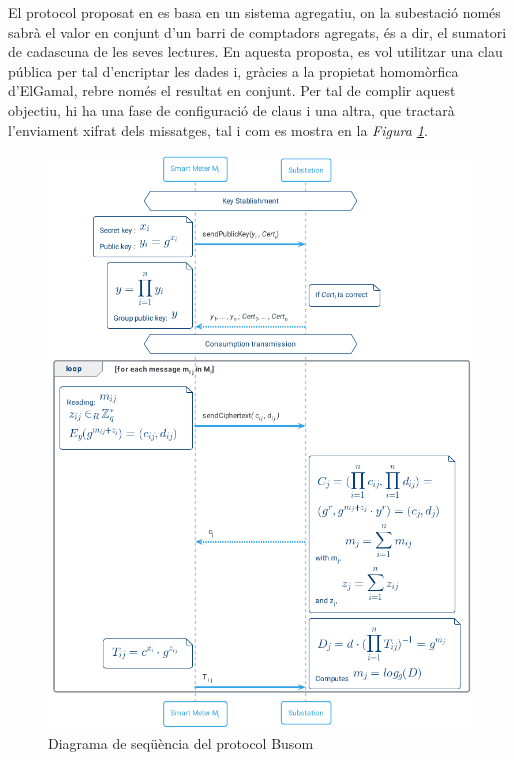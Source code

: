 

El protocol proposat en \cite{busom} es basa en un sistema agregatiu, on la subestació només sabrà el valor en conjunt d'un barri de comptadors agregats, és a dir, el sumatori de cadascuna de les seves lectures. En aquesta proposta, es vol utilitzar una clau pública per tal d'encriptar les dades i, gràcies a la propietat homomòrfica d'ElGamal, rebre només el resultat en conjunt. Per tal de complir aquest objectiu, hi ha una fase de configuració de claus i una altra, que tractarà l'enviament xifrat dels missatges, tal i com es mostra en la \textit{Figura \ref{fig:busom}}.
\begin{figure}
	\centering
	\includegraphics[width=14cm]{umls/busom.png}
	\caption{Diagrama de seqüència del protocol Busom}
	\label{fig:busom}
\end{figure}

